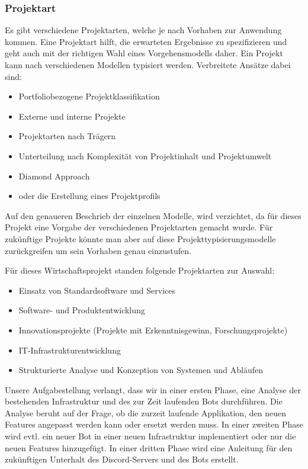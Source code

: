 \documentclass[a4paper, table]{article}
\begin{document}
\subsubsection{Projektart}
Es gibt verschiedene Projektarten, welche je nach Vorhaben zur Anwendung kommen. Eine Projektart hilft, die erwarteten Ergebnisse zu spezifizieren
und geht auch mit der richtigen Wahl eines Vorgehensmodells daher.
\newline
Ein Projekt kann nach verschiedenen Modellen typisiert werden. Verbreitete Ansätze dabei sind:
\begin{itemize}
    \item Portfoliobezogene Projektklassifikation
    \item Externe und interne Projekte
    \item Projektarten nach Trägern
    \item Unterteilung nach Komplexität von Projektinhalt und Projektumwelt
    \item Diamond Approach
    \item oder die Erstellung eines Projektprofils\autocite{claus_husselmann_zielgerichtete_nodate} %
\end{itemize}
Auf den genaueren Beschrieb der einzelnen Modelle, wird verzichtet, da für dieses Projekt eine Vorgabe der verschiedenen Projektarten gemacht wurde.
Für zukünftige Projekte könnte man aber auf diese Projekttypisierungsmodelle zurückgreifen um sein Vorhaben genau einzustufen.
\newline

Für dieses Wirtschaftsprojekt standen folgende Projektarten zur Auswahl:
\begin{itemize}
    \item Einsatz von Standardsoftware und Services
    \item Software- und Produktentwicklung
    \item Innovationsprojekte (Projekte mit Erkenntnisgewinn, Forschungsprojekte)
    \item IT-Infrastrukturentwicklung
    \item Strukturierte Analyse und Konzeption von Systemen und Abläufen \autocite{oliver_gilbert_wipro_2022} %
\end{itemize}

Unsere Aufgabestellung verlangt, dass wir in einer ersten Phase, eine Analyse der bestehenden Infrastruktur und des zur Zeit laufenden Bots durchführen.
Die Analyse beruht auf der Frage, ob die zurzeit laufende Applikation, den neuen Features angepasst werden kann oder ersetzt werden muss.
In einer zweiten Phase wird evtl. ein neuer Bot in einer neuen Infrastruktur implementiert oder nur die neuen Features hinzugefügt.
In einer dritten Phase wird eine Anleitung für den zukünftigen Unterhalt des Discord-Servers und des Bots erstellt.
\end{document}
